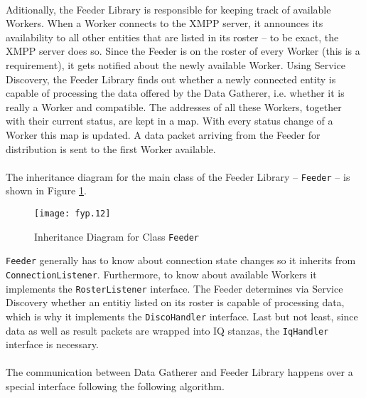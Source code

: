 \paragraph{}
Aditionally, the Feeder Library is responsible for keeping track of available Workers. When a Worker connects to the XMPP server, it announces its availability to all other entities that are listed in its roster -- to be exact, the XMPP server does so. Since the Feeder is on the roster of every Worker (this is a requirement), it gets notified about the newly available Worker. Using Service Discovery, the Feeder Library finds out whether a newly connected entity is capable of processing the data offered by the Data Gatherer, i.e. whether it is really a Worker and compatible. The addresses of all these Workers, together with their current status, are kept in a map. With every status change of a Worker this map is updated. A data packet arriving from the Feeder for distribution is sent to the first Worker available.

\paragraph{}
The inheritance diagram for the main class of the Feeder Library -- \texttt{Feeder} -- is shown in Figure \ref{fig:inhfeeder}.

\begin{figure}[H]
\begin{center}
\texttt{[image: fyp.12]}
\end{center}
\caption{Inheritance Diagram for Class \texttt{Feeder}}
\label{fig:inhfeeder}
\end{figure}

\texttt{Feeder} generally has to know about connection state changes so it inherits from \texttt{ConnectionListener}. Furthermore, to know about available Workers it implements the \texttt{RosterListener} interface. The Feeder determines via Service Discovery whether an entitiy listed on its roster is capable of processing data, which is why it implements the \texttt{DiscoHandler} interface. Last but not least, since data as well as result packets are wrapped into IQ stanzas, the \texttt{IqHandler} interface is necessary.

\paragraph{}
The communication between Data Gatherer and Feeder Library happens over a special interface following the following algorithm.

